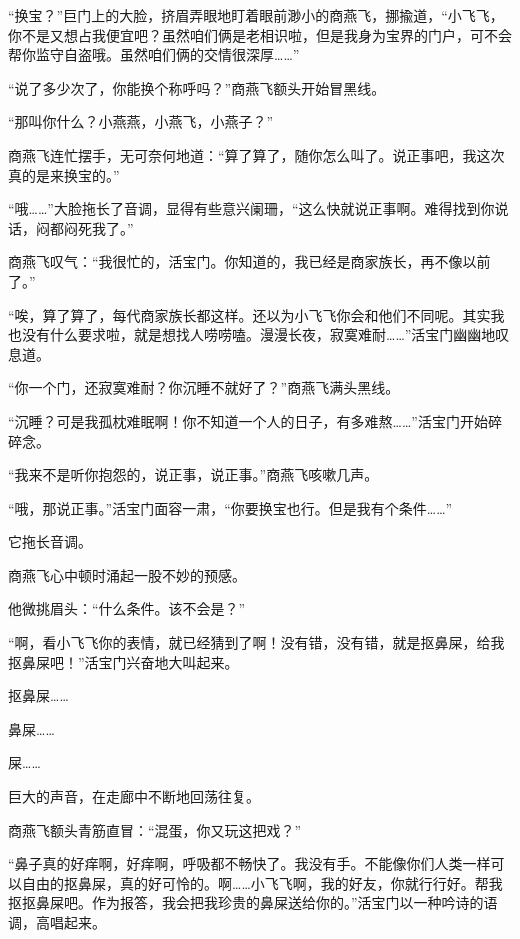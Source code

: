 
\begin{this_body}



“换宝？”巨门上的大脸，挤眉弄眼地盯着眼前渺小的商燕飞，挪揄道，“小飞飞，你不是又想占我便宜吧？虽然咱们俩是老相识啦，但是我身为宝界的门户，可不会帮你监守自盗哦。虽然咱们俩的交情很深厚……”

“说了多少次了，你能换个称呼吗？”商燕飞额头开始冒黑线。

“那叫你什么？小燕燕，小燕飞，小燕子？”

商燕飞连忙摆手，无可奈何地道：“算了算了，随你怎么叫了。说正事吧，我这次真的是来换宝的。”

“哦……”大脸拖长了音调，显得有些意兴阑珊，“这么快就说正事啊。难得找到你说话，闷都闷死我了。”

商燕飞叹气：“我很忙的，活宝门。你知道的，我已经是商家族长，再不像以前了。”

“唉，算了算了，每代商家族长都这样。还以为小飞飞你会和他们不同呢。其实我也没有什么要求啦，就是想找人唠唠嗑。漫漫长夜，寂寞难耐……”活宝门幽幽地叹息道。

“你一个门，还寂寞难耐？你沉睡不就好了？”商燕飞满头黑线。

“沉睡？可是我孤枕难眠啊！你不知道一个人的日子，有多难熬……”活宝门开始碎碎念。

“我来不是听你抱怨的，说正事，说正事。”商燕飞咳嗽几声。

“哦，那说正事。”活宝门面容一肃，“你要换宝也行。但是我有个条件……”

它拖长音调。

商燕飞心中顿时涌起一股不妙的预感。

他微挑眉头：“什么条件。该不会是？”

“啊，看小飞飞你的表情，就已经猜到了啊！没有错，没有错，就是抠鼻屎，给我抠鼻屎吧！”活宝门兴奋地大叫起来。

抠鼻屎……

鼻屎……

屎……

巨大的声音，在走廊中不断地回荡往复。

商燕飞额头青筋直冒：“混蛋，你又玩这把戏？”

“鼻子真的好痒啊，好痒啊，呼吸都不畅快了。我没有手。不能像你们人类一样可以自由的抠鼻屎，真的好可怜的。啊……小飞飞啊，我的好友，你就行行好。帮我抠抠鼻屎吧。作为报答，我会把我珍贵的鼻屎送给你的。”活宝门以一种吟诗的语调，高唱起来。


\end{this_body}
